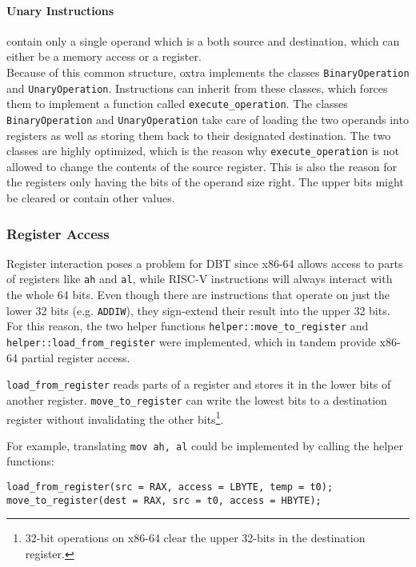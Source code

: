 		\paragraph{Unary Instructions} contain only a single operand which is a both source and destination, which can either be a memory access or a register.\\
		
		Because of this common structure, oxtra implements the classes \texttt{BinaryOperation} and \texttt{UnaryOperation}. Instructions can inherit from these classes, which forces them to implement a function called \texttt{execute\_operation}. The classes \texttt{BinaryOperation} and \texttt{UnaryOperation} take care of loading the two operands into registers as well as storing them back to their designated destination. The two classes are highly optimized, which is the reason why \texttt{execute\_operation} is not allowed to change the contents of the source register. This is also the reason for the registers only having the bits of the operand size right. The upper bits might be cleared or contain other values.
	
	\subsubsection{Register Access}
	Register interaction poses a problem for DBT since x86-64 allows access to parts of registers like \texttt{ah} and \texttt{al}, while RISC-V instructions will always interact with the whole 64 bits. Even though there are instructions that operate on just the lower 32 bits (e.g. \texttt{ADDIW}), they sign-extend their result into the upper 32 bits. For this reason, the two helper functions \texttt{helper::move\_to\_register} and \texttt{helper::load\_from\_register} were implemented, which in tandem provide x86-64 partial register access.
	
	\texttt{load\_from\_register} reads parts of a register and stores it in the lower bits of another register. \texttt{move\_to\_register} can write the lowest bits to a destination register without invalidating the other bits\footnote{32-bit operations on x86-64 clear the upper 32-bits in the destination register.}.
	
	For example, translating \texttt{mov ah, al} could be implemented by calling the helper functions:
	\begin{lstlisting}
load_from_register(src = RAX, access = LBYTE, temp = t0);
move_to_register(dest = RAX, src = t0, access = HBYTE);
	\end{lstlisting}
	
